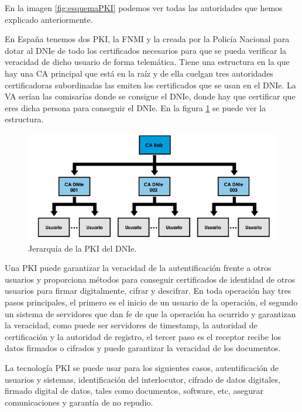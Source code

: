 En la imagen \ref{fig:esquemaPKI} podemos ver todas las autoridades que hemos explicado anteriormente.

En España tenemos dos PKI, la FNMI y la creada por la Policía Nacional para dotar al DNIe de todo los certificados necesarios para que se pueda verificar la veracidad de dicho usuario de forma telemática. Tiene una estructura en la que hay una CA principal que está en la raíz y de ella cuelgan tres autoridades certificadoras subordinadas las emiten los certificados que se usan en el DNIe. La VA serían las comisarías donde se consigue el DNIe, donde hay que certificar que eres dicha persona para conseguir el DNIe. En la figura \ref{fig:pkiDnie} se puede ver la estructura.

\begin{figure}
  \centering
    \includegraphics[scale=1]{./Criptografia/imagenes/pkiDnie.png}
  \caption{Jerarquía de la PKI del DNIe.}
  \label{fig:pkiDnie}
\end{figure} 

Una PKI puede garantizar la veracidad de la autentificación frente a otros usuarios y proporciona métodos para conseguir certificados de identidad de otros usuarios para firmar digitalmente, cifrar y descifrar. En toda operación hay tres pasos principales, el primero es el inicio de un usuario de la operación, el segundo un sistema de servidores que dan fe de que la operación ha ocurrido y garantizan la veracidad, como puede ser servidores de timestamp, la autoridad de certificación y la autoridad de registro, el tercer paso es el receptor recibe los datos firmados o cifrados y puede garantizar la veracidad de los documentos.

La tecnología PKI se puede usar para los siguientes casos, autentificación de usuarios y sistemas, identificación del interlocutor, cifrado de datos digitales, firmado digital de datos, tales como documentos, software, etc, asegurar comunicaciones y garantía de no repudio.

